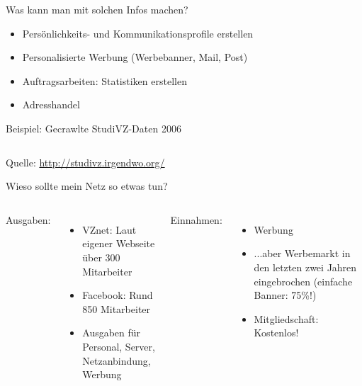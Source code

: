 \begin{frame}{Was kann man mit solchen Infos machen?}
	\begin{itemize}
		\item Persönlichkeits- und Kommunikationsprofile erstellen
		\item Personalisierte Werbung (Werbebanner, Mail, Post)
		\item Auftragsarbeiten: Statistiken erstellen
		\item Adresshandel
	\end{itemize}
\end{frame}

\begin{frame}{Beispiel: Gecrawlte StudiVZ-Daten 2006}
	\begin{columns}
	\end{columns}
	\vfill
	{\tiny Quelle: \url{http://studivz.irgendwo.org/}}
\end{frame}

\begin{frame}{Wieso sollte mein Netz so etwas tun?}
	\begin{columns}
		\column{.5\textwidth}
		Ausgaben:
		\begin{itemize}
			\item VZnet: Laut eigener Webseite über 300 Mitarbeiter
			\item Facebook: Rund 850 Mitarbeiter
			\item<2-> Ausgaben für Personal, Server, Netzanbindung, Werbung
		\end{itemize}
		\column{.5\textwidth}
		Einnahmen:
		\begin{itemize}
			\item<3-> Werbung
			\item<4-> ...aber Werbemarkt in den letzten zwei Jahren eingebrochen (einfache Banner: 75\%!)
			\item<5-> Mitgliedschaft: Kostenlos!
		\end{itemize}
	\end{columns}
\end{frame}

